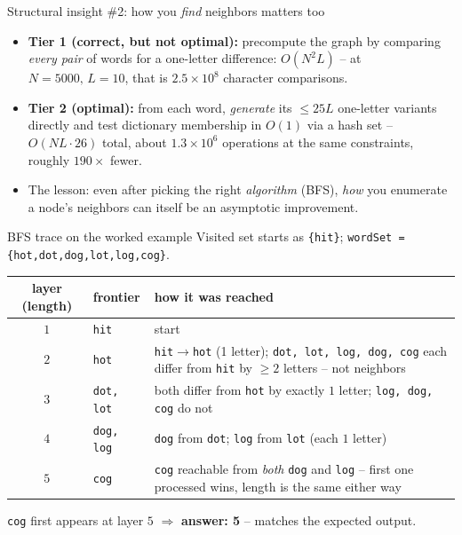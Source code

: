 \documentclass[11pt,aspectratio=169]{beamer}
\begin{document}
\begin{frame}{Structural insight \#2: how you \emph{find} neighbors matters too}
  \begin{itemize}
    \item \textbf{Tier 1 (correct, but not optimal):} precompute the graph by comparing
    \emph{every pair} of words for a one-letter difference: $O(N^2 L)$ -- at
    $N{=}5000,\,L{=}10$, that is $2.5\times10^8$ character comparisons.
    \item \textbf{Tier 2 (optimal):} from each word, \emph{generate} its $\le 25L$
    one-letter variants directly and test dictionary membership in $O(1)$ via a hash
    set -- $O(NL \cdot 26)$ total, about $1.3\times10^6$ operations at the same
    constraints, roughly $190\times$ fewer.
    \item The lesson: even after picking the right \emph{algorithm} (BFS), \emph{how}
    you enumerate a node's neighbors can itself be an asymptotic improvement.
  \end{itemize}
\end{frame}

\begin{frame}{BFS trace on the worked example}
  \scriptsize
  Visited set starts as \texttt{\{hit\}}; \texttt{wordSet =
  \{hot,dot,dog,lot,log,cog\}}.
  \begin{center}
  \begin{tabular}{@{}c p{2.4cm} p{7.4cm}@{}}
    \toprule
    layer (length) & frontier & how it was reached \\
    \midrule
    $1$ & \texttt{hit} & start \\
    $2$ & \texttt{hot} & \texttt{hit}$\to$\texttt{hot} (1 letter); \texttt{dot, lot,
    log, dog, cog} each differ from \texttt{hit} by $\ge 2$ letters -- not neighbors \\
    $3$ & \texttt{dot, lot} & both differ from \texttt{hot} by exactly $1$ letter;
    \texttt{log, dog, cog} do not \\
    $4$ & \texttt{dog, log} & \texttt{dog} from \texttt{dot}; \texttt{log} from
    \texttt{lot} (each $1$ letter) \\
    $5$ & \texttt{cog} & \texttt{cog} reachable from \emph{both} \texttt{dog} and
    \texttt{log} -- first one processed wins, length is the same either way \\
    \bottomrule
  \end{tabular}
  \end{center}
  \texttt{cog} first appears at layer $5$ $\Rightarrow$ \textbf{answer: 5} -- matches
  the expected output.
\end{frame}
\end{document}
